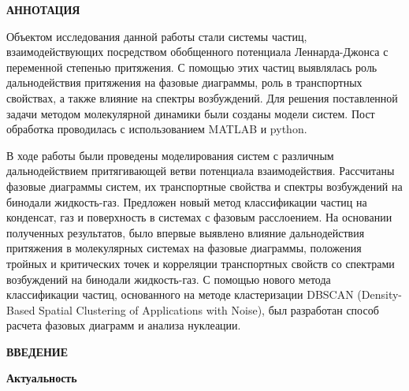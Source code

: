 
\begin{center}
\textbf{\large АННОТАЦИЯ}
\end{center}


Объектом исследования данной работы стали системы частиц, взаимодействующих посредством обобщенного потенциала Леннарда-Джонса с переменной степенью притяжения.
С помощью этих частиц выявлялась роль дальнодействия притяжения на фазовые диаграммы, роль в транспортных свойствах, а также влияние на спектры возбуждений.
Для решения поставленной задачи методом молекулярной динамики были созданы модели систем.
Пост обработка проводилась с использованием MATLAB и python.

В ходе работы были проведены моделирования систем с различным дальнодействием притягивающей ветви потенциала взаимодействия.
Рассчитаны фазовые диаграммы систем, их транспортные свойства и спектры возбуждений на бинодали жидкость-газ.
Предложен новый метод классификации частиц на конденсат, газ и поверхность в системах с фазовым расслоением.
На основании полученных результатов, было впервые выявлено влияние дальнодействия притяжения в молекулярных системах на фазовые диаграммы, положения тройных и критических точек и корреляции транспортных свойств со спектрами возбуждений на бинодали жидкость-газ.
С помощью нового метода классификации частиц, основанного на методе кластеризации DBSCAN (Density-Based Spatial Clustering of Applications with Noise), был разработан способ расчета фазовых диаграмм и анализа нуклеации.

\onehalfspacing
\setcounter{page}{2}

\newpage
\renewcommand{\contentsname}{\centerline{\large СОДЕРЖАНИЕ}}
\tableofcontents

\newpage
\begin{center}
\textbf{\large ВВЕДЕНИЕ}
\end{center}


\textbf{Актуальность}

